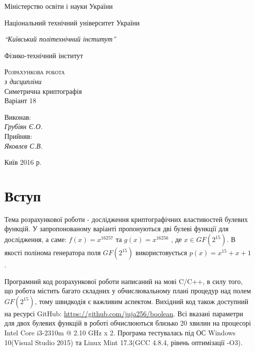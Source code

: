 \documentclass[a4paper,12pt]{article}
\begin{document}
\begin{titlepage}
  \begin{center}
    \large
    Міністерство освіти і науки України
    
    Національний технічний університет України

    \textit{“Київський політехнічний інститут”}
    
    Фізико-технічний інститут
    \vspace{5cm}

    \textsc{Розрахункова робота}\\[5mm]
    \textit{з дисципліни}\\
    
    {\LARGE Симетрична криптографія }\\
    {\large Варіант 18}
  \bigskip
    
    
\end{center}
\vspace{3cm}
\hfill
\begin{minipage}{0.3\textwidth}
\large
  Виконав:\\
  \textit{Грубіян Є.О.}\\
  Прийняв:\\
  \textit{Яковлєв С.В.}\\ 
  
\end{minipage}
\bigskip

\vfill
\vfill
\vfill
\begin{center}
  Київ 2016 р.
\end{center}

\end{titlepage}
\section*{Вступ}
Тема розрахункової роботи - дослідження криптографічних властивостей булевих функцій. У запропонованому варіанті пропонуються дві булеві функції для дослідження, а саме: \( f(x) = x^{16257} \) та \( g(x) = x^{16256} \) , де \( x \in GF(2^{15}) \). В якості полінома генератора поля \( GF(2^{15}) \) використовується \( p(x) = x^{15} + x + 1 \).

Програмний код розрахункової роботи написаний на мові C/C++, в силу того, що робота містить багато складних у обчислювальному плані процедур над полем \( GF(2^{15}) \), тому швидкодія є важливим аспектом. Вихідний код також доступний на ресурсі GitHub: \url{https://github.com/juja256/boolean}. Всі вказані параметри для двох булевих функцій в роботі обчислюються близько 20 хвилин на процесорі Intel Core i3-2310m @ 2.10 GHz x 2. Програма тестувалась під ОС Windows 10(Visual Studio 2015) та Linux Mint 17.3(GCC 4.8.4, рівень оптимізації -O3).
\end{document}
